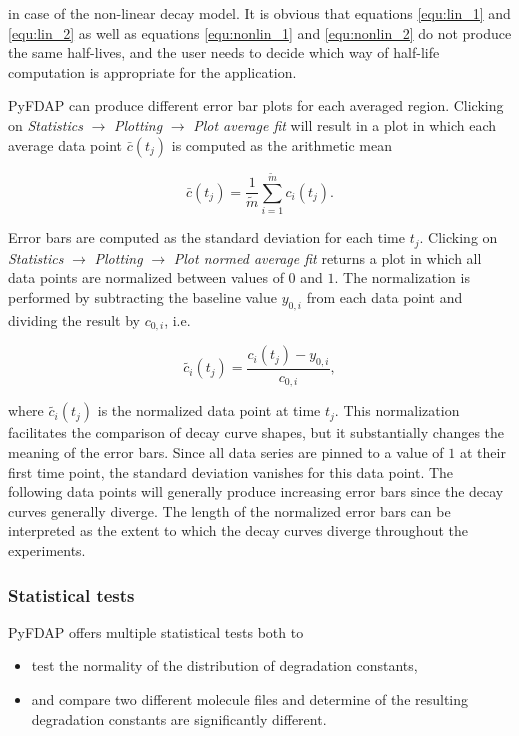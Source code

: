 \documentclass[a4paper,11pt]{article}
\begin{document}
\noindent in case of the non-linear decay model. It is obvious that equations \ref{equ:lin_1} and \ref{equ:lin_2} as well as equations \ref{equ:nonlin_1} and \ref{equ:nonlin_2} do not produce the same half-lives, and the user needs to decide which way of half-life computation is appropriate for the application.

PyFDAP can produce different error bar plots for each averaged region. Clicking on \textit{Statistics} $\rightarrow$ \textit{Plotting} $\rightarrow$ \textit{Plot average fit} will result in a plot in which each average data point $\bar{c}(t_j)$ is computed as the arithmetic mean

\begin{equation*}
\bar{c}(t_j)=\frac{1}{\tilde{m}}\sum\limits_{i=1}^{\tilde{m}} c_i (t_j).
\end{equation*}

\noindent Error bars are computed as the standard deviation for each time $t_j$. Clicking on \textit{Statistics} $\rightarrow$ \textit{Plotting} $\rightarrow$ \textit{Plot normed average fit} returns a plot in which all data points are normalized between values of $0$ and $1$. The normalization is performed by subtracting the baseline value $y_{0,i}$ from each data point and dividing the result by $c_{0,i}$, i.e.

\begin{equation*}
\tilde{c_i}(t_j)= \frac{c_i (t_j)-y_{0,i}}{c_{0,i}},
\end{equation*}

\noindent where $\tilde{c_i}(t_j)$ is the normalized data point at time $t_j$. This normalization facilitates the comparison of decay curve shapes, but it substantially changes the meaning of the error bars. Since all data series are pinned to a value of $1$ at their first time point, the standard deviation vanishes for this data point. The following data points will generally produce increasing error bars since the decay curves generally diverge. The length of the normalized error bars can be interpreted as the extent to which the decay curves diverge throughout the experiments.

\subsubsection{Statistical tests}
\label{sec:statstest}

PyFDAP offers multiple statistical tests both to 
\begin{itemize}
 \item test the normality of the distribution of degradation constants,
 \item and compare two different molecule files and determine of the resulting degradation constants are significantly different. 
\end{itemize}
\end{document}
